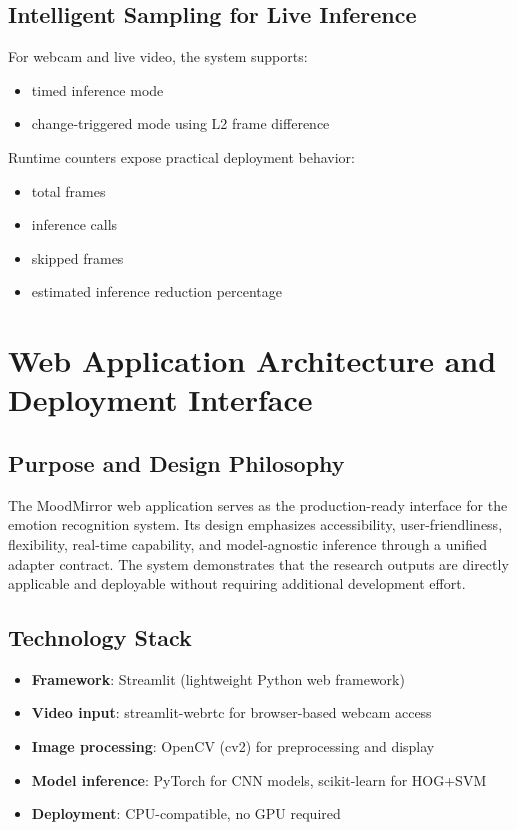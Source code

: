 \documentclass[12pt,a4paper]{article}
\begin{document}
\subsection{Intelligent Sampling for Live Inference}
For webcam and live video, the system supports:
\begin{itemize}[leftmargin=*]
    \item timed inference mode
    \item change-triggered mode using L2 frame difference
\end{itemize}
Runtime counters expose practical deployment behavior:
\begin{itemize}[leftmargin=*]
    \item total frames
    \item inference calls
    \item skipped frames
    \item estimated inference reduction percentage
\end{itemize}

\section{Web Application Architecture and Deployment Interface}

\subsection{Purpose and Design Philosophy}
The MoodMirror web application serves as the production-ready interface for the emotion recognition system. Its design emphasizes accessibility, user-friendliness, flexibility, real-time capability, and model-agnostic inference through a unified adapter contract. The system demonstrates that the research outputs are directly applicable and deployable without requiring additional development effort.

\subsection{Technology Stack}
\begin{itemize}[leftmargin=*]
    \item \textbf{Framework}: Streamlit (lightweight Python web framework)
    \item \textbf{Video input}: streamlit-webrtc for browser-based webcam access
    \item \textbf{Image processing}: OpenCV (cv2) for preprocessing and display
    \item \textbf{Model inference}: PyTorch for CNN models, scikit-learn for HOG+SVM
    \item \textbf{Deployment}: CPU-compatible, no GPU required
\end{itemize}
\end{document}
